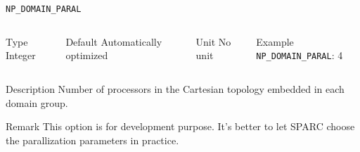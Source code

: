 \begin{frame}[allowframebreaks]{\texttt{NP\_DOMAIN\_PARAL}} \label{NP_DOMAIN_PARAL}
\vspace*{-12pt}
\begin{columns}
\begin{block}{Type}
Integer
\end{block}

\begin{block}{Default}
Automatically optimized
\end{block}

\begin{block}{Unit}
No unit
\end{block}

\begin{block}{Example}
\texttt{NP\_DOMAIN\_PARAL}: 4
\end{block}
\end{columns}

\begin{block}{Description}
Number of processors in the Cartesian topology embedded in each domain group.
\end{block}

\begin{block}{Remark}
This option is for development purpose. It's better to let SPARC choose the parallization parameters in practice.
\end{block}
\end{frame}


